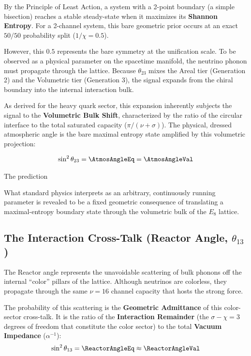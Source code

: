 By the Principle of Least Action, a system with a 2-point boundary (a simple bisection) reaches a stable steady-state when it maximizes its \textbf{Shannon Entropy}. For a 2-channel system, this bare geometric prior occurs at an exact $50/50$ probability split ($1/\chi = 0.5$). 

However, this $0.5$ represents the bare symmetry at the unification scale. To be observed as a physical parameter on the spacetime manifold, the neutrino phonon must propagate through the lattice. Because $\theta_{23}$ mixes the Areal tier (Generation 2) and the Volumetric tier (Generation 3), the signal expands from the chiral boundary into the internal interaction bulk. 

As derived for the heavy quark sector, this expansion inherently subjects the signal to the \textbf{Volumetric Bulk Shift}, characterized by the ratio of the circular interface to the total saturated capacity ($\pi / (\nu + \sigma)$). The physical, dressed atmospheric angle is the bare maximal entropy state amplified by this volumetric projection:

\begin{equation}
    \sin^2 \theta_{23} = \AtmosAngleEq = \mathbf{\AtmosAngleVal}
\end{equation}

The prediction \AtmosAngleAccText

What standard physics interprets as an arbitrary, continuously running parameter is revealed to be a fixed geometric consequence of translating a maximal-entropy boundary state through the volumetric bulk of the $E_8$ lattice.

\subsection{The Interaction Cross-Talk (Reactor Angle, \texorpdfstring{$\theta_{13}$}{theta 13})}

The Reactor angle represents the unavoidable scattering of bulk phonons off the internal ``color'' pillars of the lattice. Although neutrinos are colorless, they propagate through the same $\nu=16$ channel capacity that hosts the strong force. 

The probability of this scattering is the \textbf{Geometric Admittance} of this color-sector cross-talk. It is the ratio of the \textbf{Interaction Remainder} (the $\sigma-\chi=3$ degrees of freedom that constitute the color sector) to the total \textbf{Vacuum Impedance} ($\alpha^{-1}$):
\begin{equation}
    \sin^2 \theta_{13} = \ReactorAngleEq \approx \mathbf{\ReactorAngleVal}
\end{equation}

